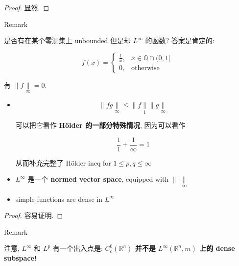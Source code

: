\begin{proof}

显然.

\end{proof}

\begin{qlremark}{Remark}

是否有在某个零测集上 unbounded 但是却 \(L^{\infty}\) 的函数? 答案是肯定的:

\[f(x) = \left\{ \begin{matrix}
{\frac{1}{x},} & {x \in \mathbb{Q} \cap (0,1\rbrack} \\
{0,} & \text{otherwise}
\end{matrix} \right.\]

有 \(\parallel f\underset{\infty}{\parallel} = 0\).

\end{qlremark}

\begin{theorem}

\begin{itemize}
\item
  \[\parallel fg\underset{\infty}{\parallel} \leq \parallel f\underset{1}{\parallel} \parallel g\underset{\infty}{\parallel}\]

  可以把它看作 \textbf{Hölder 的一部分特殊情况}, 因为可以看作

  \[\frac{1}{1} + \frac{1}{\infty} = 1\]

  从而补充完整了 Hölder ineq for \(1 \leq p,q \leq \infty\)
\item
  \(L^{\infty}\) 是一个 \textbf{normed vector space}, equipped with \(\parallel \cdot \underset{\infty}{\parallel}\)
\item
  simple functions are dense in \(L^{\infty}\)
\end{itemize}

\end{theorem}

\begin{proof}

容易证明.

\end{proof}

\begin{qlremark}{Remark}

注意, \(L^{\infty}\) 和 \(L^{p}\) 有一个出入点是: \textbf{\(C_{c}^{0}(\mathbb{R}^{n})\) 并不是 \(L^{\infty}(\mathbb{R}^{n},m)\) 上的 dense subspace!}\\

\end{qlremark}

